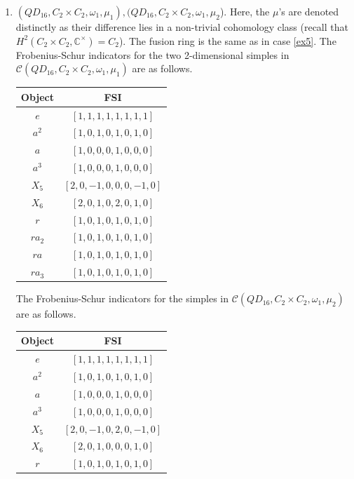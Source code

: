 \documentclass[a4paper, 10pt]{book}
\theoremstyle{definition}
\numberwithin{equation}{chapter}
\newcommand\CC{\mathbb C}
\newcommand\C{\mathcal C}
\begin{document}
\begin{enumerate}
\item $(QD_{16}, C_2\times C_2, \omega_1, \mu_1), (QD_{16}, C_2\times C_2, \omega_1, \mu_2$). Here, the $\mu$'s are denoted distinctly as their difference lies in a non-trivial cohomology class (recall that $H^2(C_2\times C_2, \CC^\times) = C_2$). The fusion ring is the same as in case \ref{ex5}. The Frobenius-Schur indicators for the two 2-dimensional simples in $\C(QD_{16}, C_2\times C_2, \omega_1, \mu_1)$ are as follows.
\begin{center}
\begin{tabular}{|c|c|}
\hline
Object & FSI                          \\ \hline
$e$    & $[1, 1, 1, 1, 1, 1, 1, 1]$   \\ \hline
$a^2$  & $[1, 0, 1, 0, 1, 0, 1, 0]$   \\ \hline
$a$    & $[1, 0, 0, 0, 1, 0, 0, 0]$   \\ \hline
$a^3$  & $[1, 0, 0, 0, 1, 0, 0, 0]$   \\ \hline
$X_5$  & $[2, 0, -1, 0, 0, 0, -1, 0]$ \\ \hline
$X_6$  & $[2, 0, 1, 0, 2, 0, 1, 0]$   \\ \hline
$r$    & $[1, 0, 1, 0, 1, 0, 1, 0]$   \\ \hline
$ra_2$ & $[1, 0, 1, 0, 1, 0, 1, 0]$   \\ \hline
$ra$   & $[1, 0, 1, 0, 1, 0, 1, 0]$   \\ \hline
$ra_3$ & $[1, 0, 1, 0, 1, 0, 1, 0]$   \\ \hline
\end{tabular}
\end{center}
 The Frobenius-Schur indicators for the simples in $\C(QD_{16}, C_2\times C_2, \omega_1, \mu_2)$ are as follows.
\begin{center}
\begin{tabular}{|c|c|}
\hline
Object & FSI                          \\ \hline
$e$    & $[1, 1, 1, 1, 1, 1, 1, 1]$   \\ \hline
$a^2$  & $[1, 0, 1, 0, 1, 0, 1, 0]$   \\ \hline
$a$    & $[1, 0, 0, 0, 1, 0, 0, 0]$   \\ \hline
$a^3$  & $[1, 0, 0, 0, 1, 0, 0, 0]$   \\ \hline
$X_5$  & $[2, 0, -1, 0, 2, 0, -1, 0]$ \\ \hline
$X_6$  & $[2, 0, 1, 0, 0, 0, 1, 0]$   \\ \hline
$r$    & $[1, 0, 1, 0, 1, 0, 1, 0]$   \\ \hline

\end{tabular}
\end{center}
\end{enumerate}
\end{document}
